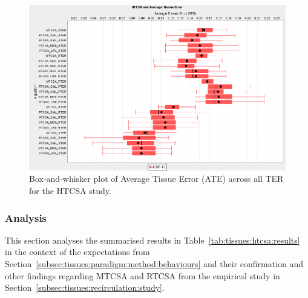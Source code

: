 \begin{figure}[htp]
	\centering
		\includegraphics[scale=0.70]{Tissues/HTCSA-ATE}
	\caption{Box-and-whisker plot of Average Tissue Error (ATE) across all TER for the HTCSA study.}
	\label{fig:tissues:htcsa:ate:boxplot}
\end{figure}


%
%
\subsubsection{Analysis}
This section analyses the summarised results in Table~\ref{tab:tissues:htcsa:results} in the context of the expectations from Section~\ref{subsec:tissues:paradigm:method:behaviours} and their confirmation and other findings regarding MTCSA and RTCSA from the empirical study in Section~\ref{subsec:tissues:recirculation:study}.

%
%
